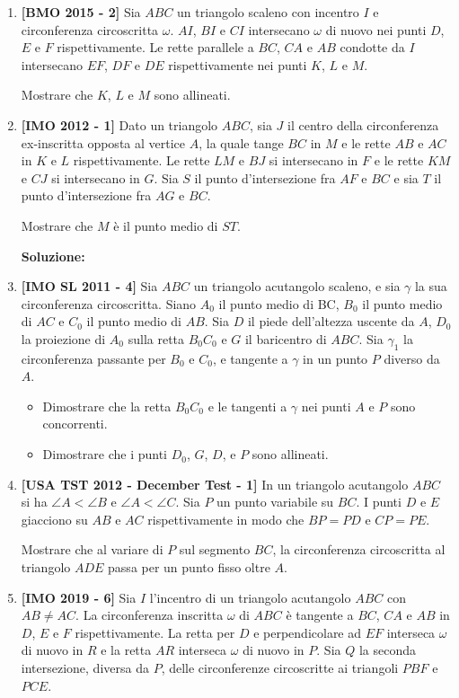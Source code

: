 \begin{enumerate}
	\item \textbf{[BMO 2015 - 2]} Sia $ABC$ un triangolo scaleno con incentro $I$ e circonferenza circoscritta $\omega$. $AI$, $BI$ e $CI$ intersecano $\omega$ di nuovo nei punti $D$, $E$ e $F$ rispettivamente. Le rette parallele a $BC$, $CA$ e $AB$ condotte da $I$ intersecano $EF$, $DF$ e $DE$ rispettivamente nei punti $K$, $L$ e $M$.
	
	Mostrare che $K$, $L$ e $M$ sono allineati.
	
	\item \textbf{[IMO 2012 - 1]} Dato un triangolo $ABC$, sia $J$ il centro della circonferenza ex-inscritta opposta al vertice $A$, la quale tange $BC$ in $M$ e le rette $AB$ e $AC$ in $K$ e $L$ rispettivamente. Le rette $LM$ e $BJ$ si intersecano in $F$ e le rette $KM$ e $CJ$ si intersecano in $G$. Sia $S$ il punto d'intersezione fra $AF$ e $BC$ e sia $T$ il punto d'intersezione fra $AG$ e $BC$. 
	
	Mostrare che $M$ è il punto medio di $ST$.
	
	\textbf{Soluzione:}
	
	\item \textbf{[IMO SL 2011 - 4]} Sia $ABC$ un triangolo acutangolo scaleno, e sia $\gamma$ la sua circonferenza circoscritta.
	Siano $A_0$ il punto medio di BC, $B_0$ il punto medio di $AC$ e $C_0$ il punto medio di $AB$. Sia
	$D$ il piede dell’altezza uscente da $A$, $D_0$ la proiezione di $A_0$ sulla retta $B_0C_0$ e $G$ il
	baricentro di $ABC$. Sia $\gamma_1$ la circonferenza passante per $B_0$ e $C_0$, e tangente a $\gamma$ in un
	punto $P$ diverso da $A$.
	\begin{itemize}
	\item Dimostrare che la retta $B_0C_0$ e le tangenti a $\gamma$ nei punti $A$ e $P$ sono concorrenti.
	\item Dimostrare che i punti $D_0$, $G$, $D$, e $P$ sono allineati.
	\end{itemize}
	\item \textbf{[USA TST 2012 - December Test - 1]} In un triangolo acutangolo $ABC$ si ha $\angle A<\angle B$ e $\angle A<\angle C$. Sia $P$ un punto variabile su $BC$. I punti $D$ e $E$ giacciono su $AB$ e $AC$ rispettivamente in modo che $BP=PD$ e $CP=PE$.
	
	Mostrare che al variare di $P$ sul segmento $BC$, la circonferenza circoscritta al triangolo $ADE$ passa per un punto fisso oltre $A$.
	\item  \textbf{[IMO 2019 - 6]} 
	Sia $I$ l'incentro di un triangolo acutangolo $ABC$ con $AB\neq AC$. La circonferenza inscritta $\omega$ di $ABC$ è tangente a $BC$, $CA$ e $AB$ in $D$, $E$ e $F$ rispettivamente. La retta per $D$ e perpendicolare ad $EF$ interseca $\omega$ di nuovo in $R$ e la retta $AR$ interseca $\omega$ di nuovo in $P$. Sia $Q$ la seconda intersezione, diversa da $P$, delle circonferenze circoscritte ai triangoli $PBF$ e $PCE$.
	

\end{enumerate}
